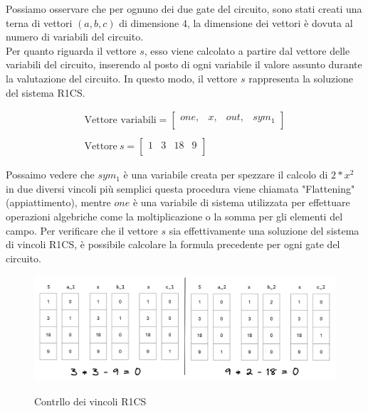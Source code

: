 \begin{enumerate}
    Possiamo osservare che per ognuno dei due gate del circuito, sono stati creati una terna di vettori $(a,b,c)$ di
    dimensione 4, la dimensione dei vettori è dovuta al numero di variabili del circuito. \\
    Per quanto riguarda il vettore $s$, esso viene calcolato a partire dal vettore delle variabili del circuito,
    inserendo al posto di ogni variabile il valore assunto durante la valutazione del circuito. In questo modo, il
    vettore $s$ rappresenta la soluzione del sistema R1CS.

    \begin{gather*}
        \text{Vettore variabili} =
        \begin{bmatrix}
            one, & x, & out, & sym_1 \\
        \end{bmatrix}
        \\
        \\
        \text{Vettore} \ s =
        \begin{bmatrix}
        1 & 3 & 18 & 9 \\
        \end{bmatrix}
    \end{gather*}

    Possaimo vedere che $sym_1$ è una variabile creata per spezzare il calcolo di $2*x^2$ in due diversi vincoli più
    semplici questa procedura viene chiamata "Flattening" (appiattimento), mentre $one$ è una variabile di sistema
    utilizzata per effettuare operazioni algebriche come la moltiplicazione o la somma per gli elementi del campo. Per
    verificare che il vettore $s$ sia effettivamente una soluzione del sistema di vincoli R1CS, è possibile calcolare la
    formula precedente per ogni gate del circuito.

    \begin{figure}[H]
        \centering
        \includegraphics[width=15cm]{./chapters/1.state-of-art/images/10.check_r1cs.png}
        \label{fig:check-r1cs}
        \captionsetup{justification=centering}
        \caption{Contrllo dei vincoli R1CS}
    \end{figure}


\end{enumerate}
